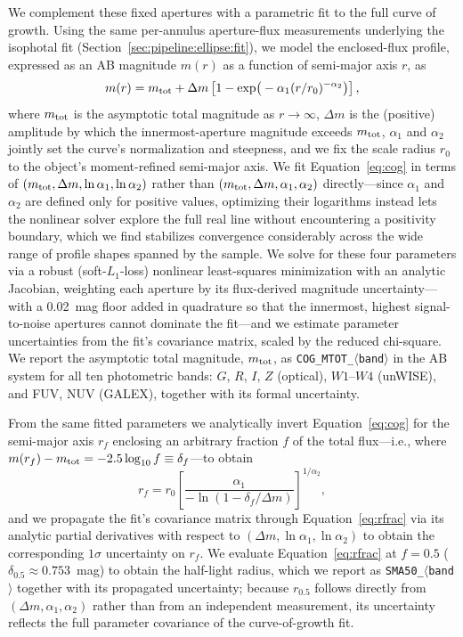 \documentclass[modern,linenumbers]{aastex701}
\begin{document}
We complement these fixed apertures with a parametric fit to the full
curve of growth. Using the same per-annulus aperture-flux measurements
underlying the isophotal fit (Section~\ref{sec:pipeline:ellipse:fit}),
we model the enclosed-flux profile, expressed as an AB magnitude $m(r)$
as a function of semi-major axis $r$, as
\begin{equation}
  m(r) = m_{\rm tot} + \Delta m \left[1 - \exp\!\big(-\alpha_1
    (r/r_0)^{-\alpha_2}\big)\right],
  \label{eq:cog}
\end{equation}
where $m_{\rm tot}$ is the asymptotic total magnitude as $r \to \infty$,
$\Delta m$ is the (positive) amplitude by which the innermost-aperture
magnitude exceeds $m_{\rm tot}$, $\alpha_1$ and $\alpha_2$ jointly set
the curve's normalization and steepness, and we fix the scale radius
$r_0$ to the object's moment-refined semi-major axis. We fit
Equation~\ref{eq:cog} in terms of $(m_{\rm tot}, \Delta m, \ln\alpha_1,
\ln\alpha_2)$ rather than $(m_{\rm tot}, \Delta m, \alpha_1, \alpha_2)$
directly---since $\alpha_1$ and $\alpha_2$ are defined only for
positive values, optimizing their logarithms instead lets the
nonlinear solver explore the full real line without encountering a
positivity boundary, which we find stabilizes convergence considerably
across the wide range of profile shapes spanned by the sample. We
solve for these four parameters via a robust (soft-$L_1$-loss)
nonlinear least-squares minimization with an analytic Jacobian,
weighting each aperture by its flux-derived magnitude uncertainty---with
a 0.02~mag floor added in quadrature so that the innermost,
highest signal-to-noise apertures cannot dominate the fit---and we
estimate parameter uncertainties from the fit's covariance matrix,
scaled by the reduced chi-square. We report the asymptotic total
magnitude, $m_{\rm tot}$, as \texttt{COG\_MTOT\_$\langle$band$\rangle$}
in the AB system for all ten photometric bands: $G$, $R$, $I$, $Z$
(optical), $W1$--$W4$ (unWISE), and FUV, NUV (GALEX), together with its
formal uncertainty.

From the same fitted parameters we analytically invert
Equation~\ref{eq:cog} for the semi-major axis $r_f$ enclosing an
arbitrary fraction $f$ of the total flux---i.e., where $m(r_f) -
m_{\rm tot} = -2.5\log_{10} f \equiv \delta_f$---to obtain
\begin{equation}
  r_f = r_0 \left[\frac{\alpha_1}{-\ln\!\left(1 - \delta_f/\Delta
      m\right)}\right]^{1/\alpha_2},
  \label{eq:rfrac}
\end{equation}
and we propagate the fit's covariance matrix through
Equation~\ref{eq:rfrac} via its analytic partial derivatives with
respect to $(\Delta m, \ln\alpha_1, \ln\alpha_2)$ to obtain the
corresponding $1\sigma$ uncertainty on $r_f$. We evaluate
Equation~\ref{eq:rfrac} at $f = 0.5$ ($\delta_{0.5} \approx
0.753$~mag) to obtain the half-light radius, which we report as
\texttt{SMA50\_$\langle$band$\rangle$} together with its propagated
uncertainty; because $r_{0.5}$ follows directly from $(\Delta
m,\alpha_1,\alpha_2)$ rather than from an independent measurement, its
uncertainty reflects the full parameter covariance of the
curve-of-growth fit.
\end{document}
